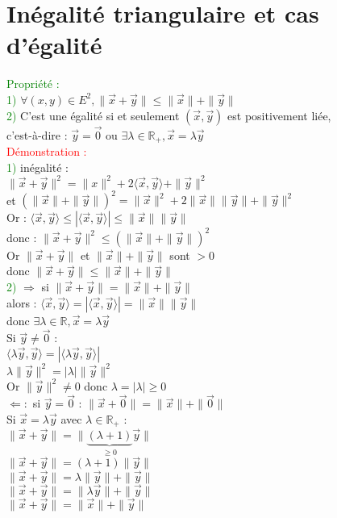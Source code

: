 \documentclass{article}
\begin{document}
\section{Inégalité triangulaire et cas d'égalité}
\textcolor{green}{Propriété :} \\
\textcolor{green}{1)} $\forall (x,y) \in E^2, \| \vec x + \vec y \| \leq \| \vec x \| + \| \vec y \|$ \\
\textcolor{green}{2)} C'est une égalité si et seulement $(\vec x, \vec y)$ est positivement liée, \\
c'est-à-dire : $\vec y =\vec 0$ ou $\exists \lambda \in \mathbb R_+, \vec x= \lambda \vec y$ \\
\textcolor{red}{Démonstration :} \\
\textcolor{green}{1)} inégalité : \\
$\| \vec x + \vec y \|^2= \|x \|^2+ 2 \langle \vec x, \vec y \rangle + \| \vec y \|^2 $ \\
et $(\| \vec x \| + \| \vec y \|)^2= \| \vec x \|^2 + 2 \| \vec x \| \| \vec y \| + \| \vec y \|^2$ \\
Or : $\langle \vec x, \vec y \rangle \leq | \langle \vec x , \vec y \rangle | \leq \| \vec x \| \| \vec y \|$ \\
donc : $\| \vec x + \vec y \|^2\leq (\| \vec x \| + \| \vec y \|)^2$ \\
Or $\| \vec x + \vec y \|$ et $\| \vec x \| + \| \vec y \|$ sont $>0$ \\
donc $\| \vec x +\vec y \| \leq \| \vec x \| + \| \vec y \|$ \\
\textcolor{green}{2)} $\Rightarrow$ si $\| \vec x + \vec y \|= \| \vec x \| + \| \vec y \|$ \\
alors : $\langle \vec x, \vec y \rangle = | \langle \vec x, \vec y \rangle |= \| \vec x \| \| \vec y \|$ \\
donc $\exists \lambda \in \mathbb R ,\vec x = \lambda \vec y$ \\
Si $\vec y \neq \vec 0$ : \\
$\langle \lambda \vec y, \vec y \rangle = | \langle \lambda \vec y,\vec y \rangle |$ \\
$\lambda \| \vec y \|^2= |\lambda| \| \vec y \|^2$ \\
Or $\| \vec y \|^2 \neq 0$ donc $\lambda=|\lambda|\geq 0$ \\
$\Leftarrow :$ si $\vec y= \vec 0$ : $\|\vec x + \vec 0 \|= \| \vec x \| + \| \vec 0 \|$ \\
Si $\vec x = \lambda \vec y$ avec $\lambda \in \mathbb R_+$ : \\
$\| \vec x + \vec y \| = \| \underbrace{(\lambda +1)}_{\geq 0} \vec y \|$ \\
$\| \vec x + \vec y \| = (\lambda + 1) \| \vec y \|$ \\
$\| \vec x + \vec y \| = \lambda \|\vec y \| + \| \vec y \|$ \\
$\| \vec x + \vec y \| = \| \lambda \vec y \| + \| \vec y \|$ \\
$\| \vec x + \vec y \| = \| \vec x \| + \| \vec y \|$
\end{document}
